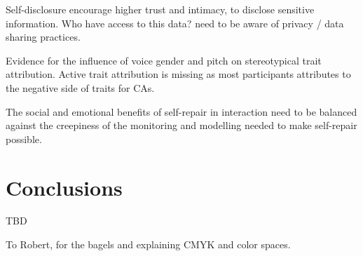 \documentclass[sigconf,screen,review, anonymous]{acmart}
\newcommand{\cmt}[1]{}%
\begin{document}
Self-disclosure encourage higher trust and intimacy, to disclose sensitive information. Who have access to this data? need to be aware of privacy / data sharing practices. \cite{lee2020hear}\cmt{[23]}

Evidence for the influence of voice gender and pitch on stereotypical trait attribution. Active trait attribution is missing as most participants attributes to the negative side of traits for CAs. \cite{tolmeijer2021female}\cmt{[62]}

The social and emotional benefits of self-repair in interaction need to be balanced against the creepiness of the monitoring and modelling needed to make self-repair possible. \cite{cuadra2021my}\cmt{[67]}

\section{Conclusions}

TBD


\begin{acks}
To Robert, for the bagels and explaining CMYK and color spaces.
\end{acks}




\appendix
\end{document}
